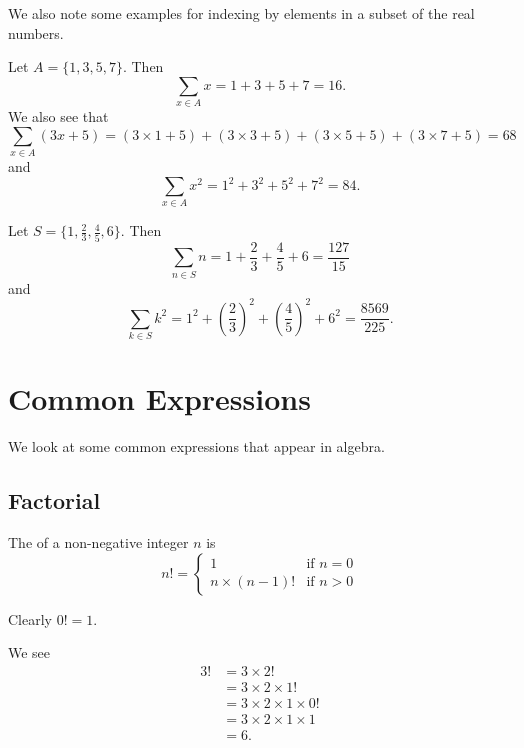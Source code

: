 We also note some examples for indexing by elements in a subset of the real numbers.

\begin{example}
    Let $A = \{1, 3, 5, 7\}$. Then
    \[
        \sum_{x \in A} x = 1 + 3 + 5 + 7 = 16.
    \]
    We also see that
    \[
        \sum_{x \in A}(3x + 5) = (3\times1 + 5) + (3\times3 + 5) + (3\times5 + 5) + (3\times7 + 5) = 68
    \]
    and
    \[
        \sum_{x\in A}x^2 = 1^2 + 3^2 + 5^2 + 7^2 = 84.
    \]
\end{example}

\begin{example}
    Let $S = \{1, \frac23, \frac45, 6\}$. Then
    \[
        \sum_{n \in S}n = 1 + \frac23 + \frac45 + 6 = \frac{127}{15}
    \]
    and
    \[
        \sum_{k \in S}k^2 = 1^2 + \left(\frac23\right)^2 + \left(\frac45\right)^2 + 6^2 = \frac{8569}{225}.
    \]
\end{example}

\newpage

\section{Common Expressions}
We look at some common expressions that appear in algebra.

\subsection{Factorial}
\begin{definition}
    The  of a non-negative integer $n$ is
    \[
        n! = \begin{cases}
            1 & \text{if } n = 0\\
            n \times (n-1)! & \text{if } n > 0
        \end{cases}
    \]
\end{definition}

\begin{example}
    Clearly $0! = 1$.
\end{example}

\begin{example}
    We see
    \begin{align*}
        3! &= 3 \times 2!\\
        &= 3 \times 2 \times 1!\\
        &= 3 \times 2 \times 1 \times 0!\\
        &= 3 \times 2  \times 1  \times 1\\
        &= 6.
    \end{align*}
\end{example}

